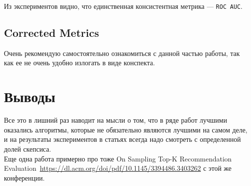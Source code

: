 Из экспериментов видно, что единственная консистентная метрика --- \texttt{ROC AUC}.

\subsection*{Corrected Metrics}

Очень рекомендую самостоятельно ознакомиться с данной частью работы, так как ее не очень удобно излогать в виде конспекта.

\section*{Выводы}


Все это в лишний раз наводит на мысли о том, что в ряде работ лучшими оказались алгоритмы, которые не обязательно являются лучшими на самом деле, и на результаты экспериментов в статьях всегда надо смотреть с определенной долей скепсиса. \\

Еще одна работа примерно про тоже On Sampling Top-K Recommendation Evaluation~\url{https://dl.acm.org/doi/pdf/10.1145/3394486.3403262} с этой же конференции.